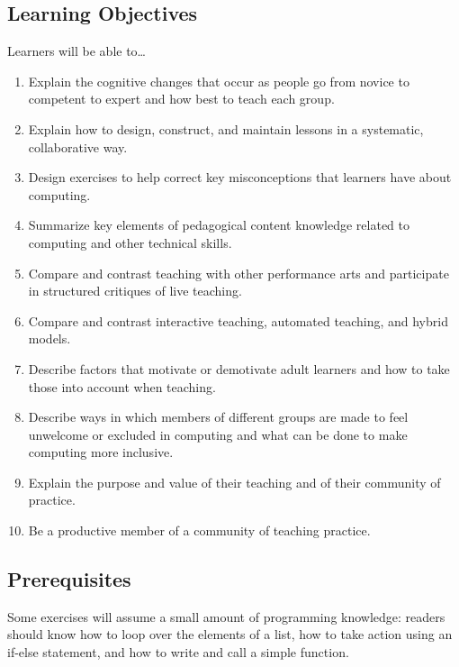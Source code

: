\subsection{Learning Objectives}\label{learning-objectives}

Learners will be able to\ldots{}

\begin{enumerate}
\item
  Explain the cognitive changes that occur as people go from novice to
  competent to expert and how best to teach each group.
\item
  Explain how to design, construct, and maintain lessons in a
  systematic, collaborative way.
\item
  Design exercises to help correct key misconceptions that learners
  have about computing.
\item
  Summarize key elements of pedagogical content knowledge related to
  computing and other technical skills.
\item
  Compare and contrast teaching with other performance arts and
  participate in structured critiques of live teaching.
\item
  Compare and contrast interactive teaching, automated teaching, and
  hybrid models.
\item
  Describe factors that motivate or demotivate adult learners and how
  to take those into account when teaching.
\item
  Describe ways in which members of different groups are made to feel
  unwelcome or excluded in computing and what can be done to make
  computing more inclusive.
\item
  Explain the purpose and value of their teaching and of their
  community of practice.
\item
  Be a productive member of a community of teaching practice.
\end{enumerate}

\subsection{Prerequisites}\label{prerequisites}

Some exercises will assume a small amount of programming knowledge:
readers should know how to loop over the elements of a list, how to take
action using an if-else statement, and how to write and call a simple
function.
